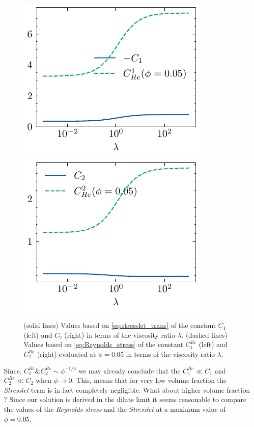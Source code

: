 \begin{figure}
    \centering
    \includegraphics[height=0.25\textwidth]{image/Theory/C1.pdf}
    \includegraphics[height=0.25\textwidth]{image/Theory/C2.pdf}
    \caption{
    (solid lines) Values based on \ref{eq:stresslet_trans} of the constant $C_1$ (left)  and $C_2$ (right) in terms of the viscosity ratio $\lambda$.
    (dashed lines) Values based on \ref{eq:Reynolds_stress} of the constant $C_1^{Re}$ (left) and $C_2^{Re}$ (right)  evaluated at $\phi = 0.05$ in terms of the viscosity ratio $\lambda$.
    }
    \label{fig:relative_comparaison}
\end{figure}
Since, $C_1^{Re} \& C_2^{Re} \sim \phi^{-1/3}$ we may already conclude that the $C_1^{Re} \ll C_1$ and $C_2^{Re} \ll C_2$ when $\phi \to 0$. 
This, means that for very low volume fraction the \textit{Stresslet} term  is in fact completely negligible. 
What about higher volume fraction ? 
Since our solution is derived in the dilute limit it seems reasonable to compare the values of the \textit{Reynolds stress} and the \textit{Stresslet} at a maximum value of $\phi = 0.05$. 



